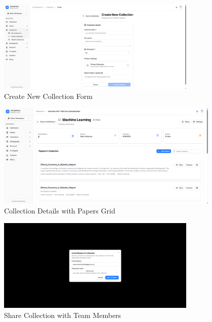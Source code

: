 \begin{figure}[H]
\centering
\includegraphics[width=0.85\textwidth]{images/screenshots/create_collection.png}
\caption{Create New Collection Form}
\label{fig:screenshot-create-collection}
\end{figure}

\begin{figure}[H]
\centering
\includegraphics[width=0.95\textwidth]{images/screenshots/collection_details.png}
\caption{Collection Details with Papers Grid}
\label{fig:screenshot-collection-details}
\end{figure}

\begin{figure}[H]
\centering
\includegraphics[width=0.85\textwidth]{images/screenshots/share_collection.png}
\caption{Share Collection with Team Members}
\label{fig:screenshot-share-collection}
\end{figure}

